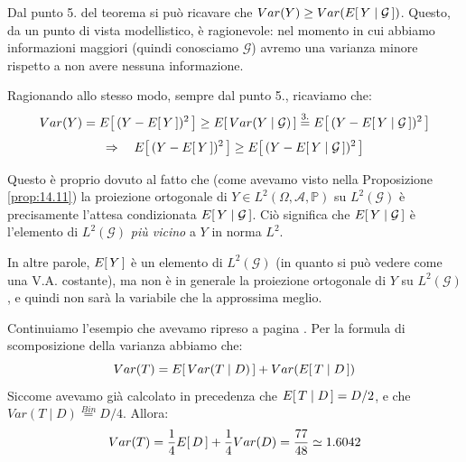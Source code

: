 Dal punto 5. del teorema si può ricavare che $Var(Y)\geq Var(E\!\left[\,Y\mid \mathcal{G}\,\right])$. Questo, da un punto di vista modellistico, è ragionevole: nel momento in cui abbiamo informazioni maggiori (quindi conosciamo $\mathcal{G}$) avremo una varianza minore rispetto a non avere nessuna informazione. 

\medskip
Ragionando allo stesso modo, sempre dal punto 5., ricaviamo che:
\[Var(Y) = E\!\left[\,(Y-E\!\left[\,Y\,\right])^2\,\right] \geq E\!\left[\,Var(Y\mid \mathcal{G})\,\right] \overset{\text{3.}}{=} E\!\left[\,(Y-E\!\left[\,Y\mid \mathcal{G}\,\right])^2\,\right]\]
\[\Rightarrow\quad E\!\left[\,(Y-E\!\left[\,Y\,\right])^2\,\right] \geq E\!\left[\,(Y-E\!\left[\,Y\mid \mathcal{G}\,\right])^2\,\right]\]

Questo è proprio dovuto al fatto che (come avevamo visto nella Proposizione \ref{prop:14.11}) la proiezione ortogonale di $Y \in L^{2}(\Omega,\mathcal A,\mathbb P)$ su $L^{2}(\mathcal G)$ è precisamente l’attesa condizionata $E\!\left[\,Y\mid\mathcal G\,\right]$. Ciò significa che $E\!\left[\,Y\mid\mathcal G\,\right]$ è l’elemento di $L^{2}(\mathcal G)$ \emph{più vicino} a $Y$ in norma $L^{2}$. 

\medskip
In altre parole, $E\!\left[\,Y\,\right]$ è un elemento di $L^{2}(\mathcal G)$ (in quanto si può vedere come una V.A. costante), ma non è in generale la proiezione ortogonale di $Y$ su $L^{2}(\mathcal G)$, e quindi non sarà la variabile che la approssima meglio.
\begin{esempio}
    Continuiamo l'esempio che avevamo ripreso a pagina \pageref{es:continuo2}. Per la formula di scomposizione della varianza abbiamo che:
    \[Var(T) = E\!\left[\,Var(T\mid D)\,\right] + Var(E\!\left[\,T\mid D\,\right])\]
    Siccome avevamo già calcolato in precedenza che $E\!\left[\,T\mid D\,\right] = D/2$, e che $Var(T\mid D) \overset{Bin}{=}D/4$. Allora:
    \[Var(T) = \frac{1}{4}E\!\left[\,D\,\right] + \frac{1}{4}Var(D) = \frac{77}{48}\simeq 1.6042\]
\end{esempio}










